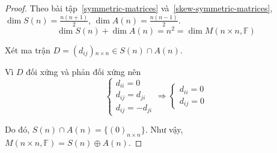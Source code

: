 \begin{proof}
    Theo bài tập~\ref{symmetric-matrices} và~\ref{skew-symmetric-matrices}, $\dim S(n) = \frac{n(n+1)}{2}$, $\dim A(n) = \frac{n(n-1)}{2}$.
    \[ \dim S(n) + \dim A(n) = n^{2} = \dim M(n\times n,\mathbb{F}) \]
    
    Xét ma trận $D = (d_{ij}){}_{n\times n} \in S(n)\cap A(n)$.
    
    Vì $D$ đối xứng và phản đối xứng nên
    \[
        \begin{cases}
            d_{ii} = 0      \\
            d_{ij} = d_{ji} \\
            d_{ij} = - d_{ji}
        \end{cases}
        \Longrightarrow
        \begin{cases}
            d_{ii} = 0 \\
            d_{ij} = 0
        \end{cases}
    \]
    
    Do đó, $S(n) \cap A(n) = \{{(0)}_{n\times n}\}$. Như vậy, $M(n\times n,\mathbb{F}) = S(n)\oplus A(n)$.
    

\end{proof}
